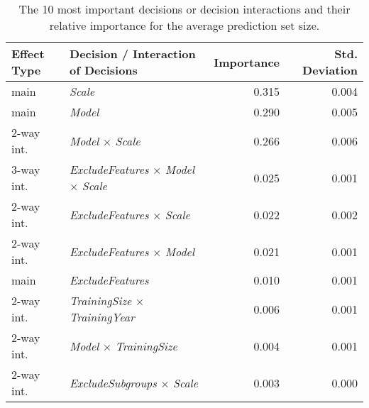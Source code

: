 \begin{table}
\centering
\caption{The 10 most important decisions or decision interactions and their relative importance for the average prediction set size.}
\label{tab:fanova_top10}
\begin{tabular}{llrr}
\toprule
Effect Type &                                      Decision / Interaction of Decisions &  Importance &  Std. Deviation \\
\midrule
       main &                                                           \textit{Scale} &       0.315 &           0.004 \\
       main &                                                           \textit{Model} &       0.290 &           0.005 \\
 2-way int. &                                   \textit{Model} $\times$ \textit{Scale} &       0.266 &           0.006 \\
 3-way int. & \textit{ExcludeFeatures} $\times$ \textit{Model} $\times$ \textit{Scale} &       0.025 &           0.001 \\
 2-way int. &                         \textit{ExcludeFeatures} $\times$ \textit{Scale} &       0.022 &           0.002 \\
 2-way int. &                         \textit{ExcludeFeatures} $\times$ \textit{Model} &       0.021 &           0.001 \\
       main &                                                 \textit{ExcludeFeatures} &       0.010 &           0.001 \\
 2-way int. &                     \textit{TrainingSize} $\times$ \textit{TrainingYear} &       0.006 &           0.001 \\
 2-way int. &                            \textit{Model} $\times$ \textit{TrainingSize} &       0.004 &           0.001 \\
 2-way int. &                        \textit{ExcludeSubgroups} $\times$ \textit{Scale} &       0.003 &           0.000 \\
\bottomrule
\end{tabular}
\end{table}
